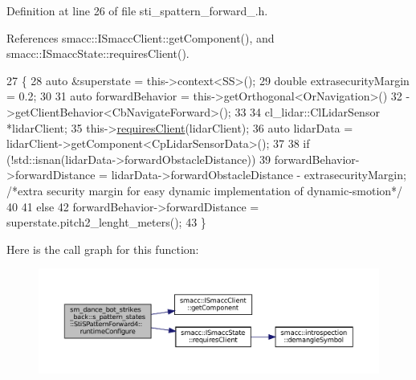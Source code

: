 Definition at line 26 of file sti\+\_\+spattern\+\_\+forward\+\_.\+h.



References smacc\+::\+I\+Smacc\+Client\+::get\+Component(), and smacc\+::\+I\+Smacc\+State\+::requires\+Client().


\begin{DoxyCode}
27   \{
28     \textcolor{keyword}{auto} &superstate = this->context<SS>();
29     \textcolor{keywordtype}{double} extrasecurityMargin = 0.2;
30 
31     \textcolor{keyword}{auto} forwardBehavior = this->getOrthogonal<OrNavigation>()
32                                ->getClientBehavior<CbNavigateForward>();
33 
34     cl\_lidar::ClLidarSensor *lidarClient;
35     this->\hyperlink{classsmacc_1_1ISmaccState_a7f95c9f0a6ea2d6f18d1aec0519de4ac}{requiresClient}(lidarClient);
36     \textcolor{keyword}{auto} lidarData = lidarClient->getComponent<CpLidarSensorData>();
37 
38     \textcolor{keywordflow}{if} (!std::isnan(lidarData->forwardObstacleDistance))
39       forwardBehavior->forwardDistance = lidarData->forwardObstacleDistance - extrasecurityMargin; \textcolor{comment}{/*extra
       security margin for easy dynamic implementation of dynamic-smotion*/}
40 
41     \textcolor{keywordflow}{else}
42       forwardBehavior->forwardDistance = superstate.pitch2\_lenght\_meters();
43   \}
\end{DoxyCode}
Here is the call graph for this function\+:
\nopagebreak
\begin{figure}[H]
\begin{center}
\leavevmode
\includegraphics[width=350pt]{structsm__dance__bot__strikes__back_1_1s__pattern__states_1_1StiSPatternForward4_a4701f0f01646b6ab3926751786b987f6_cgraph}
\end{center}
\end{figure}
\mbox{\label{structsm__dance__bot__strikes__back_1_1s__pattern__states_1_1StiSPatternForward4_a9f9603945ef905361aa95dcc171d684b}} 
